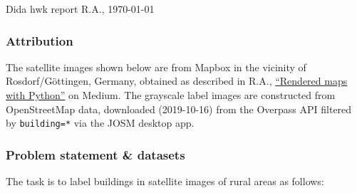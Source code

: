 \documentclass[12pt,a4paper]{article}
\begin{document}
    
    Dida hwk report
    \hfill
    R.A., \today
    
    \subsubsection*{Attribution}
    
    The satellite images shown below are from Mapbox
    in the vicinity of Rosdorf/G\"ottingen, Germany,
    obtained as described in 
    R.A., \href{https://medium.com/@busybus/rendered-maps-with-python-ffba4b34101c}{``Rendered maps with Python''} on Medium.
    The grayscale label images are constructed 
    from OpenStreetMap data,
    downloaded (2019-10-16) from the Overpass API
    filtered by \texttt{building=*}
    via 
    the JOSM desktop app.
    
    \subsubsection*{Problem statement \& datasets}
    
    The task is to label buildings in satellite images of 
    rural areas as follows:
    
\end{document}
